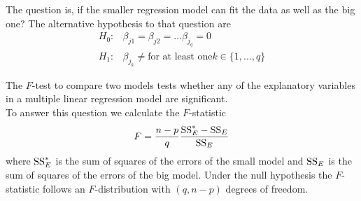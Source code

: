 The question is, if the smaller regression model can fit the data as well as the big one? The alternative hypothesis to that question are
\begin{equation}
  \begin{split}
    H_0:& \beta_{j1} = \beta_{j2} = \dots \beta_{j_q} = 0\\
    H_1:& \beta_{j_k} \neq \text{for at least one} k \in \{1,\dots,q\}
  \end{split}
\end{equation}

The $F$-test to compare two models tests whether any of the explanatory variables in a multiple linear regression model are significant.\\
To answer this question we calculate the $F$-statistic
\begin{equation}
  F = \frac{n-p}{q}\frac{\textup{SS}^*_E - \textup{SS}_E}{\textup{SS}_E}
\end{equation}
where $\textup{SS}^*_E$ is the sum of squares of the errors of the small model and $\textup{SS}_E$ is the sum of squares of the errors of the big model. Under the null hypothesis the $F$-statistic follows an $F$-distribution with $(q, n - p)$ degrees of freedom.
